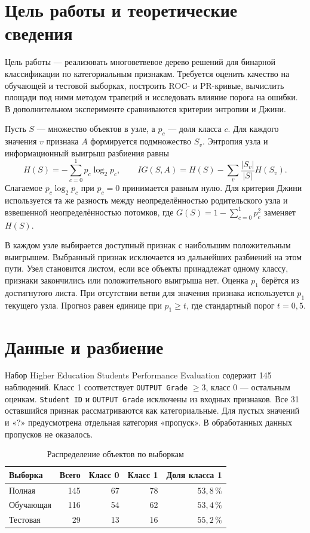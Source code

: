\section{Цель работы и теоретические сведения}

Цель работы --- реализовать многоветвевое дерево решений для бинарной
классификации по категориальным признакам. Требуется оценить качество
на обучающей и тестовой выборках, построить ROC- и PR-кривые, вычислить
площади под ними методом трапеций и исследовать влияние порога на ошибки.
В дополнительном эксперименте сравниваются критерии энтропии и Джини.

Пусть \(S\) --- множество объектов в узле, а \(p_c\) --- доля класса \(c\).
Для каждого значения \(v\) признака \(A\) формируется подмножество \(S_v\).
Энтропия узла и информационный выигрыш разбиения равны
\[
H(S)=-\sum_{c=0}^{1}p_c\log_2 p_c,
\qquad
IG(S,A)=H(S)-\sum_v\frac{|S_v|}{|S|}H(S_v).
\]
Слагаемое \(p_c\log_2 p_c\) при \(p_c=0\) принимается равным нулю.
Для критерия Джини используется та же разность между неопределённостью
родительского узла и взвешенной неопределённостью потомков, где
\(G(S)=1-\sum_{c=0}^{1}p_c^2\) заменяет \(H(S)\).

В каждом узле выбирается доступный признак с наибольшим положительным
выигрышем. Выбранный признак исключается из дальнейших разбиений на
этом пути. Узел становится листом, если все объекты принадлежат одному
классу, признаки закончились или положительного выигрыша нет.
Оценка \(p_1\) берётся из достигнутого листа. При отсутствии ветви для
значения признака используется \(p_1\) текущего узла. Прогноз равен
единице при \(p_1\geq t\), где стандартный порог \(t=0{,}5\).

\section{Данные и разбиение}

Набор Higher Education Students Performance Evaluation содержит 145
наблюдений. Класс 1 соответствует \texttt{OUTPUT Grade} \(\geq 3\),
класс 0 --- остальным оценкам. \texttt{Student ID} и \texttt{OUTPUT Grade}
исключены из входных признаков. Все 31 оставшийся признак рассматриваются
как категориальные. Для пустых значений и «?» предусмотрена отдельная
категория «пропуск». В обработанных данных пропусков не оказалось.

\begin{table}[!ht]
\centering\small
\caption{Распределение объектов по выборкам}
\begin{tabular}{lrrrr}
\toprule
Выборка & Всего & Класс 0 & Класс 1 & Доля класса 1 \\
\midrule
Полная    & 145 & 67 & 78 & \(53{,}8\,\%\) \\
Обучающая & 116 & 54 & 62 & \(53{,}4\,\%\) \\
Тестовая  & 29  & 13 & 16 & \(55{,}2\,\%\) \\
\bottomrule
\end{tabular}
\end{table}

